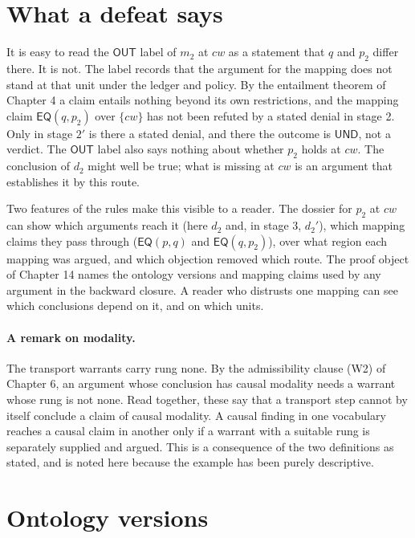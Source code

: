 \documentclass[11pt]{article}
\newcommand{\UND}{\textsf{UND}}
\newcommand{\OUT}{\textsf{OUT}}
\newcommand{\EQ}{\mathsf{EQ}}
\begin{document}
\section{What a defeat says}\label{sec:says}

It is easy to read the $\OUT$ label of $m_2$ at $cw$ as a statement that $q$ and $p_2$ differ there. It is not. The label records that the argument for the mapping does not stand at that unit under the ledger and policy. By the entailment theorem of Chapter 4 a claim entails nothing beyond its own restrictions, and the mapping claim $\EQ(q,p_2)$ over $\{cw\}$ has not been refuted by a stated denial in stage 2. Only in stage $2'$ is there a stated denial, and there the outcome is $\UND$, not a verdict. The $\OUT$ label also says nothing about whether $p_2$ holds at $cw$. The conclusion of $d_2$ might well be true; what is missing at $cw$ is an argument that establishes it by this route.

Two features of the rules make this visible to a reader. The dossier for $p_2$ at $cw$ can show which arguments reach it (here $d_2$ and, in stage 3, $d_2'$), which mapping claims they pass through ($\EQ(p,q)$ and $\EQ(q,p_2)$), over what region each mapping was argued, and which objection removed which route. The proof object of Chapter 14 names the ontology versions and mapping claims used by any argument in the backward closure. A reader who distrusts one mapping can see which conclusions depend on it, and on which units.

\paragraph{A remark on modality.} The transport warrants carry rung $\mathrm{none}$. By the admissibility clause (W2) of Chapter 6, an argument whose conclusion has causal modality needs a warrant whose rung is not $\mathrm{none}$. Read together, these say that a transport step cannot by itself conclude a claim of causal modality. A causal finding in one vocabulary reaches a causal claim in another only if a warrant with a suitable rung is separately supplied and argued. This is a consequence of the two definitions as stated, and is noted here because the example has been purely descriptive.

\section{Ontology versions}\label{sec:versions}
\end{document}

